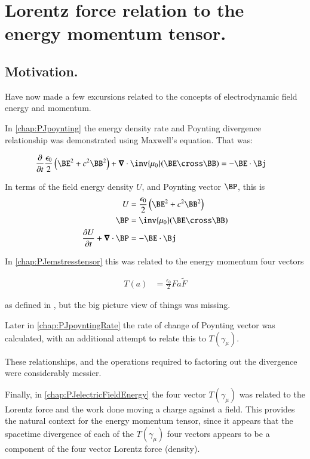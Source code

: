 \chapter{Lorentz force relation to the energy momentum tensor.}\label{chap:PJstressEnergyLorentz}

\section{Motivation. }

Have now made a few excursions related to the concepts of electrodynamic
field energy and momentum.

In \ref{chap:PJpoynting} the energy density rate and Poynting divergence 
relationship was demonstrated using Maxwell's equation.  That was:

\begin{align}
\PD{t}{}\frac{\epsilon_0}{2} \left(\BE^2 + c^2 \BB^2\right) + \spacegrad \cdot \inv{\mu_0}(\BE \cross \BB) &= -\BE \cdot \Bj 
\end{align}

In terms of the field energy density $U$, and Poynting vector $\BP$, this is
\begin{align}\label{eqn:seLorentz:energyDensityPoyntingDefined}
U &= \frac{\epsilon_0}{2} \left(\BE^2 + c^2 \BB^2\right) \\
\BP &= \inv{\mu_0}(\BE \cross \BB) \\
\PD{t}{U} + \spacegrad \cdot \BP &= -\BE \cdot \Bj 
\end{align}

In \ref{chap:PJemstresstensor} this was related to the 
energy momentum four vectors

\begin{align}
T(a) &= \frac{\epsilon_0}{2} F a \tilde{F}
\end{align}

as defined
in \cite{doran2003gap}, but the big picture view 
of things was missing.

Later in \ref{chap:PJpoyntingRate} the rate of change of Poynting vector
was calculated, with an additional attempt to relate this to $T(\gamma_\mu)$.

These relationships, and the operations required to factoring out the divergence were considerably messier.

Finally, in \ref{chap:PJelectricFieldEnergy} the four vector $T(\gamma_\mu)$
was related to the Lorentz force and the work done moving a charge against
a field.  This provides the natural context for the energy momentum tensor, 
since it appears that the spacetime divergence of each of the
$T(\gamma_\mu)$ four vectors appears to be a component of the
four vector Lorentz force (density).  

